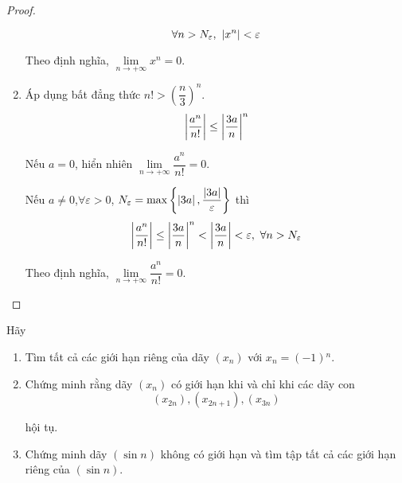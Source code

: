 \documentclass[class=analysis,crop=false]{standalone}
\begin{document}
\begin{proof}
\begin{enumerate}[label = (\roman*)]
              \[
                  \forall n > N_{\varepsilon},\ \left\vert{x^{n}}\right\vert < \varepsilon
              \]
              \par Theo định nghĩa, $\lim\limits_{n\to+\infty}x^{n} = 0$.
        \item Áp dụng bất đẳng thức $n! > \left(\dfrac{n}{3}\right)^{n}$.
              \[
                  \left\vert{\dfrac{a^{n}}{n!}}\right\vert \le \left\vert{\dfrac{3a}{n}}\right\vert^{n}
              \]
              \par Nếu $a = 0$, hiển nhiên $\lim\limits_{n\to+\infty}\dfrac{a^{n}}{n!} = 0$.
              \par Nếu $a\ne 0$,$\forall\varepsilon > 0$, $N_{\varepsilon} = \max\left\{ \left\vert{3a}\right\vert, \dfrac{\left\vert{3a}\right\vert}{\varepsilon} \right\}$ thì
              \[
                  \abs{\dfrac{a^{n}}{n!}} \le \abs{\dfrac{3a}{n}}^{n} < \abs{\dfrac{3a}{n}} < \varepsilon,\ \forall n > N_{\varepsilon}
              \]
              \par Theo định nghĩa, $\lim\limits_{n\to+\infty}\dfrac{a^{n}}{n!} = 0$.
    \end{enumerate}
\end{proof}

\begin{exercise}
    \par Hãy
    \begin{enumerate}[label = (\roman*)]
        \item Tìm tất cả các giới hạn riêng của dãy $(x_{n})$ với $x_{n} = (-1){}^{n}$.
        \item Chứng minh rằng dãy $(x_{n})$ có giới hạn khi và chỉ khi các dãy con
              \[ (x_{2n}), (x_{2n+1}), (x_{3n}) \]
              \par hội tụ.
        \item Chứng minh dãy $(\sin n)$ không có giới hạn và tìm tập tất cả các giới hạn riêng của $(\sin n)$.
    \end{enumerate}
\end{exercise}
\end{document}

